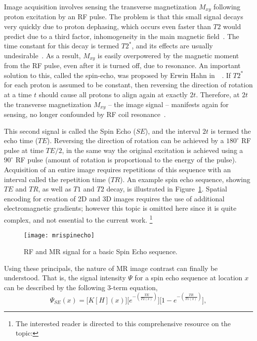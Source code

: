 Image acquisition involves sensing the transverse magnetization $M_{xy}$
following proton excitation by an RF pulse.
The problem is that this small signal decays very quickly due to proton dephasing,
which occurs even faster than $T2$ would predict due to a third factor,
inhomogeneity in the main magnetic field~\cite{Chavhan2009}.
The time constant for this decay is termed $T2^*$,
and its effects are usually undesirable~\cite{Chavhan2009}.
As a result, $M_{xy}$ is easily overpowered by the magnetic moment from the RF pulse,
even after it is turned off, due to resonance.
An important solution to this, called the spin-echo,
was proposed by Erwin Hahn in~\citeyear{Hahn1950}~\cite{Hahn1950}.
If $T2^*$ for each proton is assumed to be constant, then reversing the direction of rotation
at a time $t$ should cause all protons to align again at exactly $2t$.
Therefore, at $2t$ the transverse magnetization $M_{xy}$ -- the image signal --
manifests again for sensing, no longer confounded by RF coil resonance~\cite{Hahn1950}.
\par
This second signal is called the Spin Echo ($SE$),
and the interval $2t$ is termed the echo time ($TE$).
Reversing the direction of rotation can be achieved by a $180^{\circ}$ RF pulse
at time $TE/2$, in the same way the original excitation is achieved using a $90^{\circ}$
RF pulse (amount of rotation is proportional to the energy of the pulse).
Acquisition of an entire image requires repetitions of this sequence with an interval
called the repetition time ($TR$).
An example spin echo sequence, showing $TE$ and $TR$, as well as $T1$ and $T2$ decay,
is illustrated in Figure~\ref{fig:mrispinecho}.
Spatial encoding for creation of 2D and 3D images
requires the use of additional electromagnetic gradients;
however this topic is omitted here since it is quite complex, and not essential to the current work.%
\footnote{The interested reader is directed to this comprehensive resource on the topic:
  }
\par
\begin{figure}
  \centering\texttt{[image: mrispinecho]}
  \caption{RF and MR signal for a basic Spin Echo sequence.}%
  \label{fig:mrispinecho}
\end{figure}
Using these principals, the nature of MR image contrast can finally be understood.
That is, the signal intensity $\Psi$ for a spin echo sequence at location $x$
can be described by the following 3-term equation,
\begin{equation}\label{eq:MRI-SE}
  \Psi_{SE}(x) = \bigg[K [H](x)\bigg]
    \bigg[e^{-\left(\frac{TE}{T2(x)}\right)}\bigg]
    \bigg[1 - e^{-\left(\frac{TR}{T1(x)}\right)}\bigg],
\end{equation}
